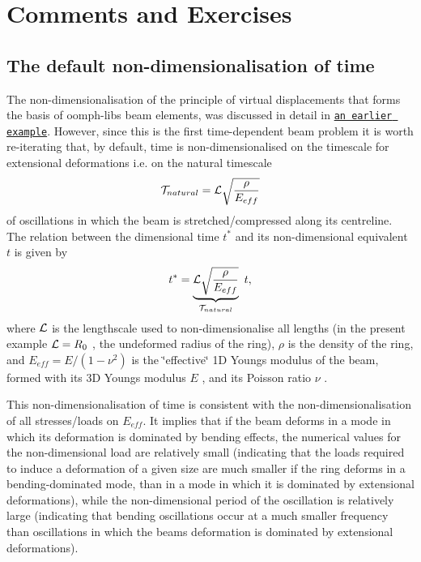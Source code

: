 \hypertarget{index_comments}{}\section{Comments and Exercises}\label{index_comments}
\hypertarget{index_timescale}{}\subsection{The default non-\/dimensionalisation of time}\label{index_timescale}
The non-\/dimensionalisation of the principle of virtual displacements that forms the basis of {\ttfamily oomph-\/lib\textquotesingle{}s} beam elements, was discussed in detail in \href{../../tensioned_string/html/index.html}{\tt an earlier example}. However, since this is the first time-\/dependent beam problem it is worth re-\/iterating that, by default, time is non-\/dimensionalised on the timescale for extensional deformations i.\+e. on the natural timescale \[ {\cal T}_{natural} = {\cal L} \sqrt{\frac{\rho}{E_{eff}}} \] of oscillations in which the beam is stretched/compressed along its centreline. The relation between the dimensional time $ t^* $ and its non-\/dimensional equivalent $ t $ is given by \[ t^* = \underbrace{{\cal L} \sqrt{\frac{\rho}{E_{eff}}}}_{{\cal T}_{natural}} \ t, \] where $ {\cal L} $ is the lengthscale used to non-\/dimensionalise all lengths (in the present example $ {\cal L} = R_0 $ , the undeformed radius of the ring), $ \rho $ is the density of the ring, and $ E_{eff} = E/(1-\nu^2)$ is the \char`\"{}effective\char`\"{} 1D Young\textquotesingle{}s modulus of the beam, formed with its 3D Young\textquotesingle{}s modulus $ E $ , and its Poisson ratio $ \nu $ .

This non-\/dimensionalisation of time is consistent with the non-\/dimensionalisation of all stresses/loads on $ E_{eff}$. It implies that if the beam deforms in a mode in which its deformation is dominated by bending effects, the numerical values for the non-\/dimensional load are relatively small (indicating that the loads required to induce a deformation of a given size are much smaller if the ring deforms in a bending-\/dominated mode, than in a mode in which it is dominated by extensional deformations), while the non-\/dimensional period of the oscillation is relatively large (indicating that bending oscillations occur at a much smaller frequency than oscillations in which the beam\textquotesingle{}s deformation is dominated by extensional deformations).



